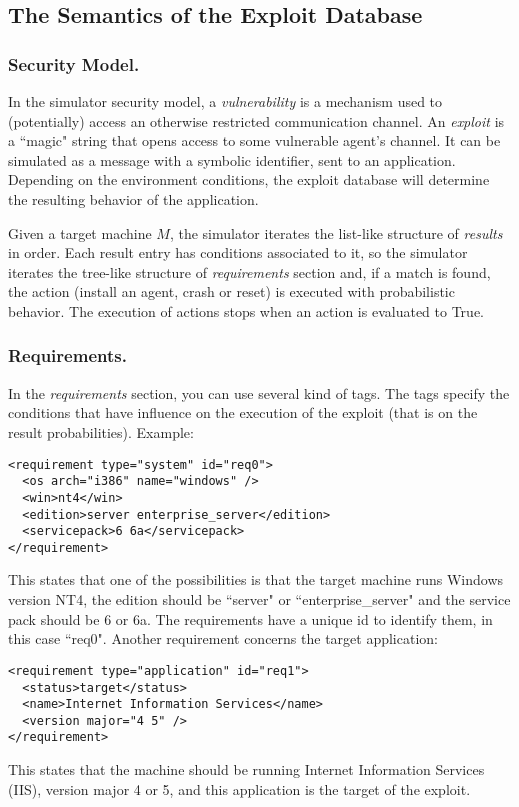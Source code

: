 \documentclass{llncs}
\begin{document}
\subsection{The Semantics of the Exploit Database}

\subsubsection{Security Model.}
In the simulator security model, a \emph{vulnerability} is a mechanism used to (potentially) access an otherwise 
restricted communication channel.
An \emph{exploit} is a ``magic" string that opens access to some vulnerable agent's channel.
It can be simulated as a message with a symbolic identifier, sent to an application.
Depending on the environment conditions, the exploit database will determine the resulting behavior
of the application.

Given a target machine $M$, the simulator iterates the list-like structure of \emph{results} in order. 
Each result entry has conditions associated  to it, so the simulator iterates the tree-like structure of  \emph{requirements}
section and, if a match is found, the action (install an agent, crash or reset) is executed with probabilistic behavior. 
The  execution of actions stops when an action is evaluated to True.
 
\subsubsection{Requirements.}

In the \emph{requirements} section, you can use several kind of  tags. 
The tags specify the conditions that have influence on the execution of the exploit 
(that is on the result probabilities). 
Example:
\begin{verbatim}
<requirement type="system" id="req0">
  <os arch="i386" name="windows" /> 
  <win>nt4</win> 
  <edition>server enterprise_server</edition> 
  <servicepack>6 6a</servicepack> 
</requirement>
\end{verbatim}
This states that one of the possibilities is that the target machine runs  Windows version NT4, 
the edition should be ``server" or ``enterprise\_server" and  the service pack should be 6 or 6a. 
The requirements have a unique id to  identify them, in this case ``req0".
Another requirement concerns the target application:
\begin{verbatim}
<requirement type="application" id="req1">
  <status>target</status> 
  <name>Internet Information Services</name> 
  <version major="4 5" /> 
</requirement>
\end{verbatim}
This states that the machine should be running Internet Information  Services (IIS), version major 4 or 5, 
and this application is the target of the  exploit.
\end{document}
